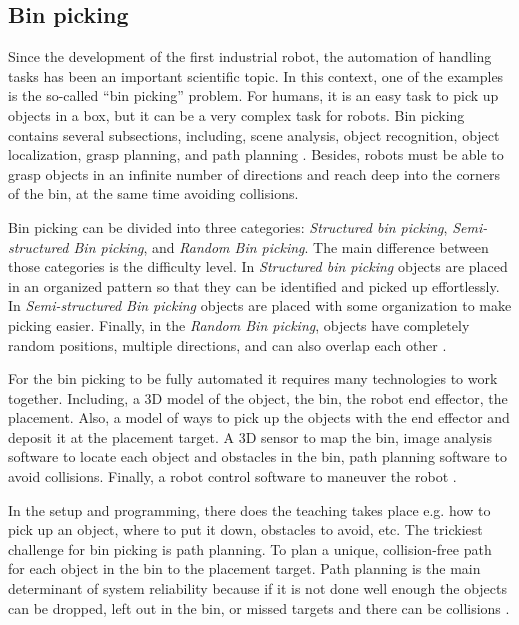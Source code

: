 

\subsection{Bin picking}
Since the development of the first industrial robot, the automation of handling tasks has been an important scientific topic. In this context, one of the examples is the so-called “bin picking” problem. For humans, it is an easy task to pick up objects in a box, but it can be a very complex task for robots. Bin picking contains several subsections, including, scene analysis, object recognition, object localization, grasp planning, and path planning \cite{buchholz_bin-picking_2015}. Besides, robots must be able to grasp objects in an infinite number of directions and reach deep into the corners of the bin, at the same time avoiding collisions\cite{truebenbach_is_2019}.

Bin picking can be divided into three categories: \textit{Structured bin picking}, \textit{Semi-structured Bin picking}, and \textit{Random Bin picking}. The main difference between those categories is the difficulty level. In \textit{Structured bin picking} objects are placed in an organized pattern so that they can be identified and picked up effortlessly. In \textit{Semi-structured Bin picking} objects are placed with some organization to make picking easier. Finally, in the \textit{Random Bin picking}, objects have completely random positions, multiple directions, and can also overlap each other \cite{noauthor_robotworx_nodate}.

For the bin picking to be fully automated it requires many technologies to work together. Including, a 3D model of the object, the bin, the robot end effector, the placement. Also, a model of ways to pick up the objects with the end effector and deposit it at the placement target. A 3D sensor to map the bin, image analysis software to locate each object and obstacles in the bin, path planning software to avoid collisions. Finally, a robot control software to maneuver the robot \cite{truebenbach_is_2019}.


In the setup and programming, there does the teaching takes place e.g. how to pick up an object, where to put it down, obstacles to avoid, etc. The trickiest challenge for bin picking is path planning. To plan a unique, collision-free path for each object in the bin to the placement target. Path planning is the main determinant of system reliability because if it is not done well enough the objects can be dropped, left out in the bin, or missed targets and there can be collisions \cite{truebenbach_is_2019}.





